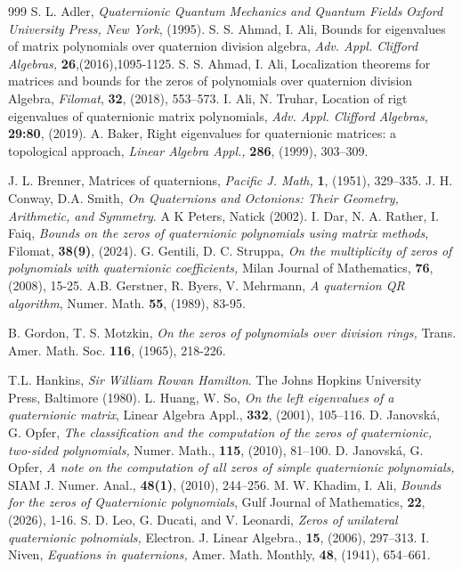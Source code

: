 \documentclass [12pt]{article}
\begin{document}
        \begin{thebibliography}{999}
S. L. Adler, \textit{Quaternionic Quantum Mechanics and Quantum Fields} \textit{Oxford University Press, New York}, (1995).
  S. S. Ahmad, I. Ali, Bounds for eigenvalues of matrix polynomials over quaternion division algebra, \textit{Adv. Appl. Clifford Algebras,} \textbf{26},(2016),1095-1125.
 S. S. Ahmad, I. Ali, Localization theorems for matrices and bounds for the zeros of polynomials over quaternion division Algebra, \textit{Filomat}, \textbf{32}, (2018), 553–573.
 I. Ali, N. Truhar, Location of rigt eigenvalues of quaternionic matrix polynomials,\textit{ Adv. Appl. Clifford Algebras}, \textbf{29:80}, (2019).
A. Baker, 
Right eigenvalues for quaternionic matrices: a topological approach, 
\textit{Linear Algebra Appl.,} \textbf{286}, (1999), 303--309.

  J. L. Brenner, Matrices of quaternions, \textit{Pacific J. Math,} \textbf{1}, (1951), 329–335.
J. H. Conway, D.A. Smith, \textit{On Quaternions and Octonions: Their Geometry, Arithmetic, and Symmetry}. A K Peters, Natick (2002).
 I. Dar, N. A. Rather, I. Faiq, \textit{Bounds on the zeros of quaternionic polynomials using matrix methods}, Filomat, \textbf{38(9)}, (2024).
 G. Gentili, D. C. Struppa, \textit{On the multiplicity of zeros of polynomials with quaternionic coefficients,} Milan Journal of Mathematics, \textbf{76}, (2008), 15-25. 
 A.B. Gerstner, R. Byers, V. Mehrmann,\textit{ A quaternion QR algorithm}, Numer. Math. \textbf{55}, (1989), 83-95.

 B. Gordon, T. S. Motzkin, \textit{On the zeros of polynomials over division rings,} Trans. Amer. Math. Soc. \textbf{116}, (1965), 218-226.


T.L. Hankins, \textit{Sir William Rowan Hamilton}. The Johns Hopkins University Press, Baltimore (1980).
L. Huang, W. So, 
\textit{On the left eigenvalues of a quaternionic matrix}, 
Linear Algebra Appl., \textbf{332}, (2001), 105--116.
 D. Janovsk\'{a}, G. Opfer, \textit{The classification and the computation of the zeros of quaternionic, two-sided polynomials,} Numer. Math., \textbf{115}, (2010), 81–100.
 D. Janovsk\'{a}, G. Opfer, \textit{A note on the computation of all zeros of simple quaternionic polynomials,}  SIAM J. Numer. Anal.,
\textbf{48(1)}, (2010), 244–256.
 M. W. Khadim, I. Ali, \textit{Bounds for the zeros of Quaternionic polynomials}, Gulf Journal of Mathematics, \textbf{22}, (2026), 1-16.
 S. D. Leo, G. Ducati, and V. Leonardi, \textit{Zeros of unilateral quaternionic polnomials,}  Electron. J. Linear Algebra., \textbf{15}, (2006), 297–313.
 I. Niven, \textit{Equations in quaternions,}  Amer. Math. Monthly,\textbf{ 48}, (1941), 654–661.



\end{thebibliography}
\end{document}
